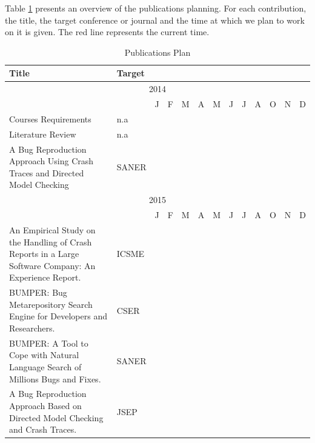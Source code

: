 Table \ref{tab:pubPlan} presents an overview of the publications planning.
For each contribution, the title, the target conference or journal and the time at which we plan to work on it is given.
The red line represents the current time.

\begin{table}[]
\centering
\small
\caption{Publications Plan}
\label{tab:pubPlan}
\begin{tabular}{p{7cm}llllllllllll}
Title & Target & &  &  &  &  &  &  &  &  &  &  \\ \hline \hline
\multicolumn{13}{c}{2014} \\ \hline
 &  & J & F & M & A & M & J & J & A & O & N & D \\ \hline
Courses Requirements & n.a & \cellcolor{green!25} & \cellcolor{green!25} & \cellcolor{green!25} & \cellcolor{green!25} & \cellcolor{green!25} & \cellcolor{green!25} & \cellcolor{green!25} &  &  &  &  \\ \hline
Literature Review & n.a &  &  &  & \cellcolor{green!25} & \cellcolor{green!25} & \cellcolor{green!25} & \cellcolor{green!25} &  &  &  &  \\ \hline
A Bug Reproduction Approach Using Crash Traces and Directed Model Checking & SANER &  &  &  &  &  &  &  & \cellcolor{green!25} & \cellcolor{green!25} & \cellcolor{green!25} & \cellcolor{green!25} \\ \hline \hline
\multicolumn{13}{c}{2015} \\ \hline
 &  & J & F & M & A & M & J & J & A & O & N & D \\ \hline
An Empirical Study on the Handling of Crash Reports in a Large Software Company: An Experience Report. & ICSME & \cellcolor{green!25} & \cellcolor{green!25} & \cellcolor{green!25} &  &  &  &  &  &  &  &  \\ \hline
BUMPER: Bug Metarepository Search Engine for Developers and Researchers. & CSER &  &  &  & \cellcolor{green!25} & \cellcolor{green!25} & \cellcolor{green!25} & \cellcolor{green!25} & \cellcolor{green!25} & \cellcolor{green!25} & \cellcolor{green!25} & \cellcolor{green!25} \\ \hline
BUMPER: A Tool to Cope with Natural Language Search of Millions Bugs and Fixes. & SANER &  &  &  & \cellcolor{green!25} & \cellcolor{green!25} & \cellcolor{green!25} & \cellcolor{green!25} & \cellcolor{green!25} & \cellcolor{green!25} & \cellcolor{green!25} & \cellcolor{green!25} \\ \hline
A Bug Reproduction Approach Based on Directed Model Checking and Crash Traces. & JSEP &  &  &  & \cellcolor{green!25} & \cellcolor{green!25} & \cellcolor{green!25} & \cellcolor{green!25} & \cellcolor{green!25} & \cellcolor{green!25} & \cellcolor{green!25} & \cellcolor{green!25} \\ \hline \hline

\end{tabular}
\end{table}
